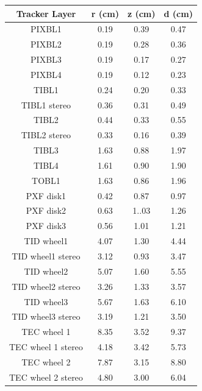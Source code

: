 \documentclass{cernatlasnote}
\begin{document}
\begin{table}
    \centering
    \begin{tabular}{|c|c|c|c|}
    \hline
     Tracker Layer  &  r (cm) &  z (cm) &  d (cm)\\
     \hline
         PIXBL1 & 0.19  & 0.39  & 0.47 \\
         \hline
         PIXBL2 & 0.19 & 0.28 & 0.36\\
         \hline
         PIXBL3 & 0.19 & 0.17 & 0.27\\
         \hline
         PIXBL4 & 0.19 & 0.12 & 0.23\\
         \hline
         TIBL1 & 0.24 & 0.20 & 0.33 \\
         \hline
         TIBL1 stereo &0.36 & 0.31 & 0.49 \\
         \hline
         TIBL2 & 0.44  & 0.33 & 0.55 \\
         \hline
         TIBL2 stereo & 0.33 & 0.16 & 0.39 \\
         \hline
         TIBL3 & 1.63 & 0.88 & 1.97\\
         \hline
         TIBL4 &  1.61 & 0.90 & 1.90\\
         \hline
         TOBL1 & 1.63 & 0.86 & 1.96 \\
         \hline
         PXF disk1 & 0.42 & 0.87 & 0.97 \\
         \hline
         PXF disk2 & 0.63 & 1..03 & 1.26 \\
         \hline
         PXF disk3 & 0.56 & 1.01 & 1.21\\
         \hline
         TID wheel1 & 4.07 & 1.30 & 4.44\\
         \hline
         TID wheel1 stereo & 3.12 & 0.93 & 3.47\\
         \hline
         TID wheel2 & 5.07 & 1.60 & 5.55\\
         \hline
         TID wheel2 stereo & 3.26 & 1.33 & 3.57\\
         \hline
         TID wheel3 & 5.67 & 1.63 & 6.10 \\
         \hline
         TID wheel3 stereo & 3.19 & 1.21 & 3.50\\
         \hline
         TEC wheel 1 & 8.35 & 3.52 & 9.37\\
         \hline
         TEC wheel 1 stereo & 4.18 & 3.42 & 5.73\\
          \hline
         TEC wheel 2 & 7.87 & 3.15 & 8.80\\
          \hline
         TEC wheel 2 stereo & 4.80 & 3.00 & 6.04\\

\end{tabular}
\end{table}
\end{document}
